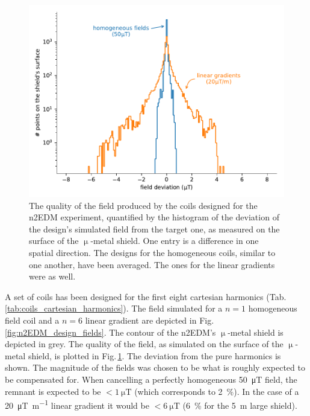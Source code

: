 \begin{figure}
  \centering
  \includegraphics[width=\linewidth]{gfx/prototype/n2EDM_coils_field.pdf}
  \caption{The quality of the field produced by the coils designed for the n2EDM experiment, quantified by the histogram of the deviation of the design's simulated field from the target one, as measured on the surface of the $\upmu$-metal shield. One entry is a difference in one spatial direction. The designs for the homogeneous coils, similar to one another, have been averaged. The ones for the linear gradients were as well. }\label{fig:n2EDM_design_deviation}
\end{figure}

A set of coils has been designed for the first eight cartesian harmonics (Tab.\,\ref{tab:coils_cartesian_harmonics}). The field simulated for a $n = 1$ homogeneous field coil and a $n = 6$ linear gradient are depicted in Fig.\,\ref{fig:n2EDM_design_fields}. The contour of the n2EDM's $\upmu$-metal shield is depicted in grey. The quality of the field, as simulated on the surface of the $\upmu$-metal shield, is plotted in Fig.\,\ref{fig:n2EDM_design_deviation}. The deviation from the pure harmonics is shown. The magnitude of the fields was chosen to be what is roughly expected to be compensated for.
When cancelling a perfectly homogeneous \SI{50}{\micro\tesla} field, the remnant is expected to be $< \SI{1}{\micro\tesla}$ (which corresponds to \SI{2}{\percent}). In the case of a \SI{20}{\micro\tesla\per\meter} linear gradient it would be $< \SI{6}{\micro\tesla}$ (\SI{6}{\percent} for the \SI{5}{\metre} large shield).

